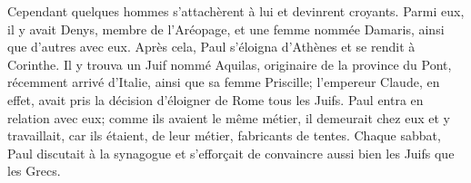Cependant quelques hommes s’attachèrent à lui et devinrent croyants.
Parmi eux, il y avait Denys, membre de l’Aréopage,
	et une femme nommée Damaris, ainsi que d’autres avec eux.
Après cela, Paul s’éloigna d’Athènes et se rendit à Corinthe.
Il y trouva un Juif nommé Aquilas, originaire de la province du Pont,
	récemment arrivé d’Italie, ainsi que sa femme Priscille;
	l’empereur Claude, en effet,
	avait pris la décision d’éloigner de Rome tous les Juifs.
Paul entra en relation avec eux;
	comme ils avaient le même métier, il demeurait chez eux et y travaillait,
	car ils étaient, de leur métier, fabricants de tentes.
Chaque sabbat, Paul discutait à la synagogue
	et s’efforçait de convaincre aussi bien les Juifs que les Grecs.
